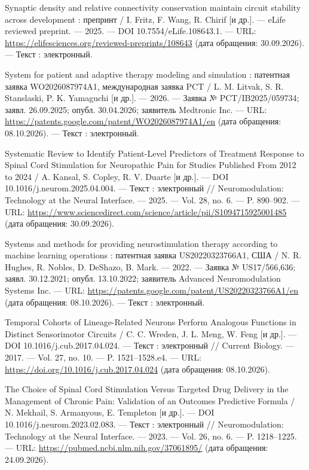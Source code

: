 \begin{list}{}{\setlength{\leftmargin}{10mm}\setlength{\labelwidth}{8mm}\setlength{\labelsep}{2mm}\setlength{\itemsep}{0pt}\setlength{\parsep}{0pt}\setlength{\topsep}{0pt}}
\item[262.] Synaptic density and relative connectivity conservation maintain circuit stability across development : препринт / I. Fritz, F. Wang, R. Chirif [и др.]. — eLife reviewed preprint. — 2025. — DOI 10.7554/eLife.108643.1. — URL: \url{https://elifesciences.org/reviewed-preprints/108643} (дата обращения: 30.09.2026). — Текст : электронный.
\item[263.] System for patient and adaptive therapy modeling and simulation : патентная заявка WO2026087974A1, международная заявка PCT / L. M. Litvak, S. R. Stanslaski, P. K. Yamaguchi [и др.]. — 2026. — Заявка № PCT/IB2025/059734; заявл. 26.09.2025; опубл. 30.04.2026; заявитель Medtronic Inc. — URL: \url{https://patents.google.com/patent/WO2026087974A1/en} (дата обращения: 08.10.2026). — Текст : электронный.
\item[264.] Systematic Review to Identify Patient-Level Predictors of Treatment Response to Spinal Cord Stimulation for Neuropathic Pain for Studies Published From 2012 to 2024 / A. Kansal, S. Copley, R. V. Duarte [и др.]. — DOI 10.1016/j.neurom.2025.04.004. — Текст : электронный // Neuromodulation: Technology at the Neural Interface. — 2025. — Vol. 28, no. 6. — P. 890–902. — URL: \url{https://www.sciencedirect.com/science/article/pii/S1094715925001485} (дата обращения: 30.09.2026).
\item[265.] Systems and methods for providing neurostimulation therapy according to machine learning operations : патентная заявка US20220323766A1, США / N. R. Hughes, R. Nobles, D. DeShazo, B. Mark. — 2022. — Заявка № US17/566,636; заявл. 30.12.2021; опубл. 13.10.2022; заявитель Advanced Neuromodulation Systems Inc. — URL: \url{https://patents.google.com/patent/US20220323766A1/en} (дата обращения: 08.10.2026). — Текст : электронный.
\item[266.] Temporal Cohorts of Lineage-Related Neurons Perform Analogous Functions in Distinct Sensorimotor Circuits / C. C. Wreden, J. L. Meng, W. Feng [и др.]. — DOI 10.1016/j.cub.2017.04.024. — Текст : электронный // Current Biology. — 2017. — Vol. 27, no. 10. — P. 1521–1528.e4. — URL: \url{https://doi.org/10.1016/j.cub.2017.04.024} (дата обращения: 08.10.2026).
\item[267.] The Choice of Spinal Cord Stimulation Versus Targeted Drug Delivery in the Management of Chronic Pain: Validation of an Outcomes Predictive Formula / N. Mekhail, S. Armanyous, E. Templeton [и др.]. — DOI 10.1016/j.neurom.2023.02.083. — Текст : электронный // Neuromodulation: Technology at the Neural Interface. — 2023. — Vol. 26, no. 6. — P. 1218–1225. — URL: \url{https://pubmed.ncbi.nlm.nih.gov/37061895/} (дата обращения: 24.09.2026).

\end{list}
